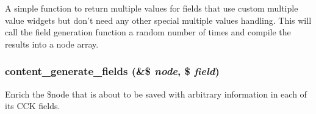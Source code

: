A simple function to return multiple values for fields that use custom multiple value widgets but don't need any other special multiple values handling. This will call the field generation function a random number of times and compile the results into a node array. \hypertarget{content_8devel_8inc_91c3f71a6d3bc64f29e75cd81d9b72d0}{
\subsubsection[{content\_\-generate\_\-fields}]{\setlength{\rightskip}{0pt plus 5cm}content\_\-generate\_\-fields (\&\$ {\em node}, \/  \$ {\em field})}}
\label{content_8devel_8inc_91c3f71a6d3bc64f29e75cd81d9b72d0}


Enrich the \$node that is about to be saved with arbitrary information in each of its CCK fields. 
